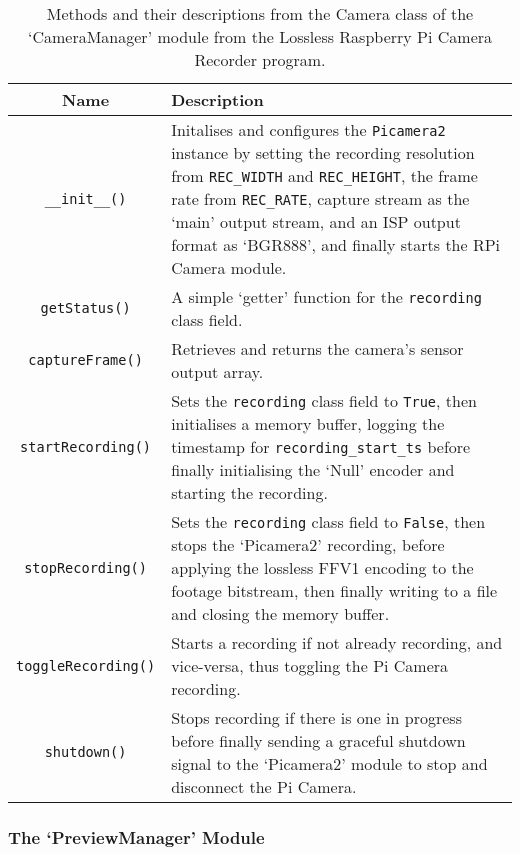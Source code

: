 \begin{table}[H]
    \centering
    \begin{tabularx}{\linewidth}{c | X}
        Name    &   Description\\
        \hline
        \hline
        \texttt{\_\_init\_\_()}     &   Initalises and configures the \texttt{Picamera2} instance by setting the recording resolution from \texttt{REC\_WIDTH} and \texttt{REC\_HEIGHT}, the frame rate from \texttt{REC\_RATE}, capture stream as the `main' output stream, and an ISP output format as `BGR888', and finally starts the RPi Camera module.\\
        \hline
        \texttt{getStatus()}     &   A simple `getter' function for the \texttt{recording} class field.\\
        \hline
        \texttt{captureFrame()}     &   Retrieves and returns the camera's sensor output array.\\
        \hline
        \texttt{startRecording()}     &   Sets the \texttt{recording} class field to \texttt{True}, then initialises a memory buffer, logging the timestamp for \texttt{recording\_start\_ts} before finally initialising the `Null' encoder and starting the recording.\\
        \hline
        \texttt{stopRecording()}     &   Sets the \texttt{recording} class field to \texttt{False}, then stops the `Picamera2' recording, before applying the lossless FFV1 encoding to the footage bitstream, then finally writing to a file and closing the memory buffer.\\
        \hline
        \texttt{toggleRecording()}     &   Starts a recording if not already recording, and vice-versa, thus toggling the Pi Camera recording.\\
        \hline
        \texttt{shutdown()}     &   Stops recording if there is one in progress before finally sending a graceful shutdown signal to the `Picamera2' module to stop and disconnect the Pi Camera.\\
        \hline
    \end{tabularx}
    \caption{Methods and their descriptions from the Camera class of the `CameraManager' module from the Lossless Raspberry Pi Camera Recorder program.}
    \label{table:cameramanagerclassfuncs}
\end{table}

\subsubsection{The `PreviewManager' Module}

